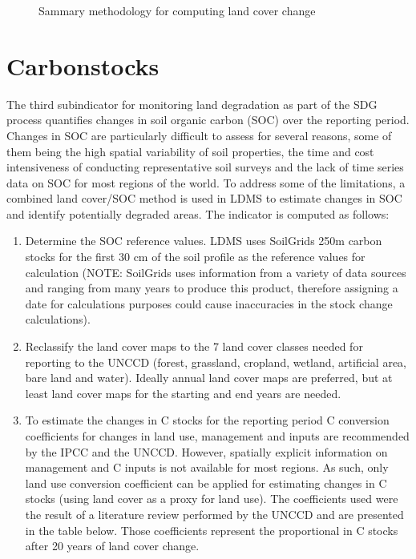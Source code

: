 \documentclass[letterpaper,10pt,english]{sphinxmanual}
\let\sphinxpxdimen\pdfpxdimen\else\newdimen\sphinxpxdimen
\begin{document}
\begin{figure}[H]
\centering
\capstart

\noindent\sphinxincludegraphics[width=621\sphinxpxdimen,height=251\sphinxpxdimen]{{lulc}.png}
\caption{Sammary methodology for computing land cover change}\label{\detokenize{Background/SDG_indicators:id4}}\end{figure}


\section{Carbon\sphinxhyphen{}stocks}
\label{\detokenize{Background/SDG_indicators:carbon-stocks}}
\sphinxAtStartPar
The third sub\sphinxhyphen{}indicator for monitoring land degradation as part of the SDG
process quantifies changes in soil organic carbon (SOC) over the reporting
period. Changes in SOC are particularly difficult to assess for several
reasons, some of them being the high spatial variability of soil properties,
the time and cost intensiveness of conducting representative soil surveys and
the lack of time series data on SOC for most regions of the world. To address
some of the limitations, a combined land cover/SOC method is used in
LDMS to estimate changes in SOC and identify potentially degraded
areas. The indicator is computed as follows:
\begin{enumerate}
%
\item {} 
\sphinxAtStartPar
Determine the SOC reference values. LDMS uses SoilGrids 250m
carbon stocks for the first 30 cm of the soil profile as the reference
values for calculation (NOTE: SoilGrids uses information from a variety of
data sources and ranging from many years to produce this product, therefore
assigning a date for calculations purposes could cause inaccuracies in the
stock change calculations).

\item {} 
\sphinxAtStartPar
Reclassify the land cover maps to the 7 land cover classes needed for
reporting to the UNCCD (forest, grassland, cropland, wetland, artificial
area, bare land and water). Ideally annual land cover maps are preferred,
but at least land cover maps for the starting and end years are needed.

\item {} 
\sphinxAtStartPar
To estimate the changes in C stocks for the reporting period C conversion
coefficients for changes in land use, management and inputs are recommended
by the IPCC and the UNCCD. However, spatially explicit information on
management and C inputs is not available for most regions. As such, only
land use conversion coefficient can be applied for estimating changes in C
stocks (using land cover as a proxy for land use). The coefficients used
were the result of a literature review performed by the UNCCD and are
presented in the table below. Those coefficients represent the proportional
in C stocks after 20 years of land cover change.

\end{enumerate}
\end{document}
